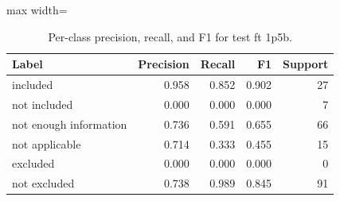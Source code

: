 \begin{table}[t]
\centering
\caption{Per-class precision, recall, and F1 for test ft 1p5b.}
\label{tab:per-class}
\begin{adjustbox}{max width=\columnwidth}
\begin{tabular}{lrrrr}
\toprule
Label & Precision & Recall & F1 & Support \\
\midrule
included & 0.958 & 0.852 & 0.902 & 27 \\
not included & 0.000 & 0.000 & 0.000 & 7 \\
not enough information & 0.736 & 0.591 & 0.655 & 66 \\
not applicable & 0.714 & 0.333 & 0.455 & 15 \\
excluded & 0.000 & 0.000 & 0.000 & 0 \\
not excluded & 0.738 & 0.989 & 0.845 & 91 \\
\bottomrule
\end{tabular}
\end{adjustbox}
\end{table}
